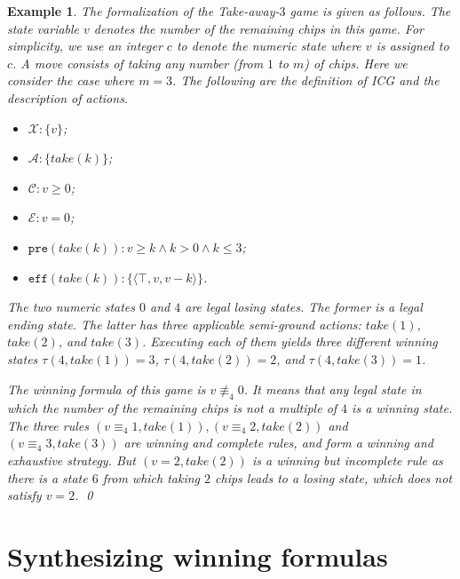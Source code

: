 \documentclass[review]{elsarticle}
\newcommand{\set}[1]{\{ #1 \}}
\newcommand{\tuple}[1]{\langle {#1} \rangle}
\newcommand{\true}{\top}
\newcommand{\statevar}{\mathcal{X}}
\newcommand{\act}{\mathcal{A}}
\newcommand{\constraint}{\mathcal{C}}
\newcommand{\estate}{\mathcal{E}}
\newcommand{\pre}{\mathtt{pre}}
\newcommand{\eff}{\mathtt{eff}}
\newcommand{\modulo}{\equiv}
\newcommand{\nmodulo}{\not \equiv}
\newtheorem{example}{Example}
\begin{document}
	\begin{example} \label{exm:take-away} %
		The formalization of the Take-away-$3$ game \cite{Gol1966} is given as follows.
		The state variable $v$ denotes the number of the remaining chips in this game. For simplicity, we use an integer $c$ to denote the numeric state where $v$ is assigned to $c$.
		A move consists of taking any number (from $1$ to $m$) of chips.
		Here we consider the case where $m = 3$. 
        The following are the definition of ICG and the description of actions.
		\begin{itemize}		    
            \item $\statevar: \set{v}$;
            \item $\act:\set{take(k)}$;
        	\item $\constraint: v \ge 0$;
        	\item $\estate: v = 0$;
			\item $\pre(take(k)): v \geq k \land k > 0 \land k \leq 3$;
			\item $\eff(take(k)): \set{\tuple{\true, v, v - k}}$.
		\end{itemize}		
        
		The two numeric states $0$ and $4$ are legal losing states.		
		The former is a legal ending state.
		The latter has three applicable semi-ground actions: $take(1)$, $take(2)$, and $take(3)$. 
		Executing each of them yields three different winning states $\tau(4, take(1)) = 3$, $\tau(4, take(2)) = 2$, and $\tau(4, take(3)) = 1$.
		
		The winning formula of this game is $v \nmodulo_4 0$.
		It means that any legal state in which the number of the remaining chips is not a multiple of $4$ is a winning state.
		The three rules $(v \modulo_4 1, take(1)), (v \modulo_4 2, take(2))$ and $(v \modulo_4 3, take(3))$ are winning and complete rules, and form a winning and exhaustive strategy.
		But $(v = 2, take(2))$ is a winning but incomplete rule as there is a state $6$ from which taking $2$ chips leads to a losing state, which does not satisfy $v = 2$.
		\qed
	\end{example}
	
\section{Synthesizing winning formulas} 
	
\end{document}
